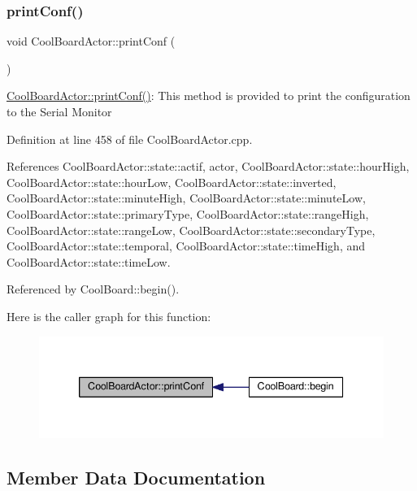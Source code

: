 \subsubsection{\texorpdfstring{print\+Conf()}{printConf()}}
{\footnotesize\ttfamily void Cool\+Board\+Actor\+::print\+Conf (\begin{DoxyParamCaption}{ }\end{DoxyParamCaption})}

\hyperlink{class_cool_board_actor_aabb10e7aebc3249ffc940530de29f84a}{Cool\+Board\+Actor\+::print\+Conf()}\+: This method is provided to print the configuration to the Serial Monitor 

Definition at line 458 of file Cool\+Board\+Actor.\+cpp.



References Cool\+Board\+Actor\+::state\+::actif, actor, Cool\+Board\+Actor\+::state\+::hour\+High, Cool\+Board\+Actor\+::state\+::hour\+Low, Cool\+Board\+Actor\+::state\+::inverted, Cool\+Board\+Actor\+::state\+::minute\+High, Cool\+Board\+Actor\+::state\+::minute\+Low, Cool\+Board\+Actor\+::state\+::primary\+Type, Cool\+Board\+Actor\+::state\+::range\+High, Cool\+Board\+Actor\+::state\+::range\+Low, Cool\+Board\+Actor\+::state\+::secondary\+Type, Cool\+Board\+Actor\+::state\+::temporal, Cool\+Board\+Actor\+::state\+::time\+High, and Cool\+Board\+Actor\+::state\+::time\+Low.



Referenced by Cool\+Board\+::begin().

Here is the caller graph for this function\+:
\nopagebreak
\begin{figure}[H]
\begin{center}
\leavevmode
\includegraphics[width=339pt]{dc/d69/class_cool_board_actor_aabb10e7aebc3249ffc940530de29f84a_icgraph}
\end{center}
\end{figure}


\subsection{Member Data Documentation}
\mbox{\label{class_cool_board_actor_a8f190db9f7a39fddbcef7f152da970e9}} 
